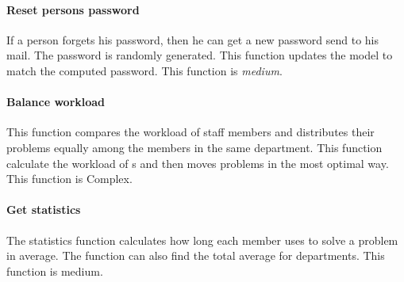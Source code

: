 \paragraph{Reset persons password}
If a person forgets his password, then he can get a new password send to his mail. The password is randomly generated. This function updates the model to match the computed password. This function is \textit{medium}.

\paragraph{Balance workload}
This function compares the workload of staff members and distributes their problems equally among the \astaff{} members in the same department. This function calculate the workload of \astaff{}s and then moves problems in the most optimal way. This function is Complex.   

\paragraph{Get statistics}
The statistics function calculates how long each \astaff[] member uses to solve a problem in average. The function can also find the total average for departments. This function is medium.










